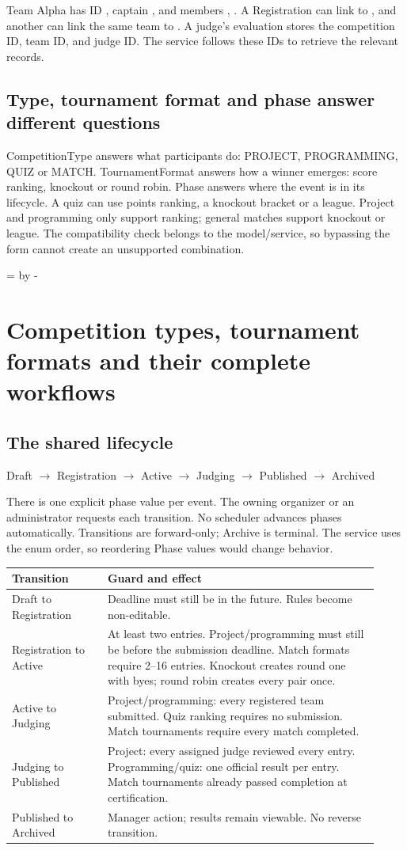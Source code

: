\documentclass[12pt]{article}
\newcommand{\topic}[1]{\needroom{9\baselineskip}\section{#1}}
\newcommand{\needroom}[1]{\par\begingroup\dimen0=\pagegoal\advance\dimen0 by -\pagetotal\ifdim\dimen0<#1\newpage\fi\endgroup}
\begin{document}
\begin{contentbox}
Team Alpha has ID , captain , and members , . A Registration can link  to , and another can link the same team to . A judge's evaluation stores the competition ID, team ID, and judge ID. The service follows these IDs to retrieve the relevant records.
\end{contentbox}

\subsection{Type, tournament format and phase answer different questions}
CompetitionType answers what participants do: PROJECT, PROGRAMMING, QUIZ or MATCH. TournamentFormat answers how a winner emerges: score ranking, knockout or round robin. Phase answers where the event is in its lifecycle. A quiz can use points ranking, a knockout bracket or a league. Project and programming only support ranking; general matches support knockout or league. The compatibility check belongs to the model/service, so bypassing the form cannot create an unsupported combination.

\topic{Competition types, tournament formats and their complete workflows}
\subsection{The shared lifecycle}
\begin{center}\small
Draft $\rightarrow$ Registration $\rightarrow$ Active $\rightarrow$ Judging $\rightarrow$ Published $\rightarrow$ Archived
\end{center}
There is one explicit phase value per event. The owning organizer or an administrator requests each transition. No scheduler advances phases automatically. Transitions are forward-only; Archive is terminal. The service uses the enum order, so reordering Phase values would change behavior.

\begin{longtable}{p{0.24\linewidth}p{0.68\linewidth}}\toprule Transition & Guard and effect\\\midrule\endhead
Draft to Registration & Deadline must still be in the future. Rules become non-editable.\\
Registration to Active & At least two entries. Project/programming must still be before the submission deadline. Match formats require 2--16 entries. Knockout creates round one with byes; round robin creates every pair once.\\
Active to Judging & Project/programming: every registered team submitted. Quiz ranking requires no submission. Match tournaments require every match completed.\\
Judging to Published & Project: every assigned judge reviewed every entry. Programming/quiz: one official result per entry. Match tournaments already passed completion at certification.\\
Published to Archived & Manager action; results remain viewable. No reverse transition.\\\bottomrule
\end{longtable}
\end{document}
